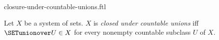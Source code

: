 \documentclass{naproche-library}
\begin{document}
\begin{smodule}[title=Closure Under Countable Unions]{closure-under-countable-unions.ftl}

\begin{definition}[forthel,id=FOUNDATIONS_14_2377279311183872]
  Let $X$ be a system of sets.
  $X$ is \emph{closed under countable unions} iff $\SETunionover U \in X$ for every nonempty countable subclass $U$ of $ X$.
\end{definition}
\end{smodule}
\end{document}
